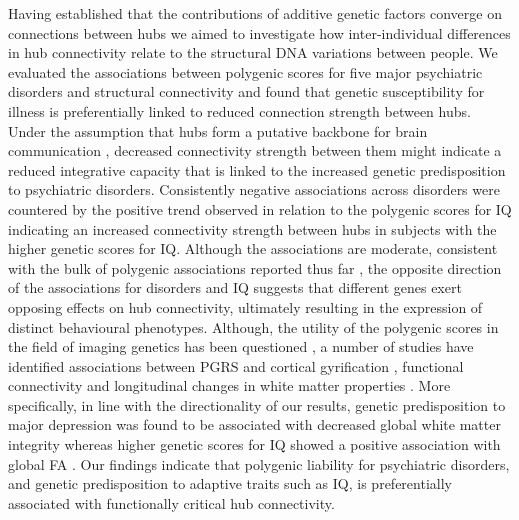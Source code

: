 Having established that the contributions of additive genetic factors converge on connections between hubs we aimed to investigate how inter-individual differences in hub connectivity relate to the structural DNA variations between people. We evaluated the associations between polygenic scores for five major psychiatric disorders and structural connectivity and found that genetic susceptibility for illness is preferentially linked to reduced connection strength between hubs. Under the assumption that hubs form a putative backbone for brain communication \citep{Harriger2012,Towlson2013,VandenHeuvel2011,VandenHeuvel2013b}, decreased connectivity strength between them might indicate a reduced integrative capacity that is linked to the increased genetic predisposition to psychiatric disorders. Consistently negative associations across disorders were countered by the positive trend observed in relation to the polygenic scores for IQ indicating an increased connectivity strength between hubs in subjects with the higher genetic scores for IQ. Although the associations are moderate, consistent with the bulk of polygenic associations reported thus far \citep{Alloza2018,Dezhina2018,Liu2016a,Sadeh2018,Wang2017}, the opposite direction of the associations for disorders and IQ suggests that different genes exert opposing effects on hub connectivity, ultimately resulting in the expression of distinct behavioural phenotypes. Although, the utility of the polygenic scores in the field of imaging genetics has been questioned \citep{Reus2017}, a number of studies have identified associations between PGRS and cortical gyrification \citep{Liu2016a}, functional connectivity \citep{Dezhina2018,Sadeh2018,Wang2017} and longitudinal changes in white matter properties \citep{Alloza2018}. More specifically, in line with the directionality of our results, genetic predisposition to major depression was found to be associated with decreased global white matter integrity \citep{Whalley2013} whereas higher genetic scores for IQ showed a positive association with global FA \citep{Jansen2018}. Our findings indicate that polygenic liability for psychiatric disorders, and genetic predisposition to adaptive traits such as IQ, is preferentially associated with functionally critical hub connectivity. 

